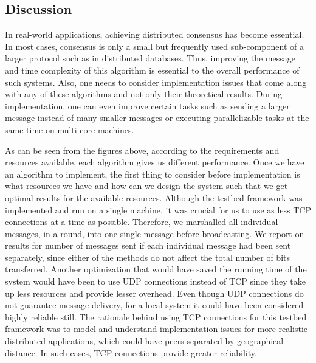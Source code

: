 %


\subsection{Discussion}

In real-world applications, achieving distributed consensus has become essential. In most cases, consensus is only a small but frequently used sub-component of a larger protocol such as in distributed databases. Thus, improving the message and time complexity of this algorithm is essential to the overall performance of such systems. Also, one needs to consider implementation issues that come along with any of these algorithms and not only their theoretical results. During implementation, one can even improve certain tasks such as sending a larger message instead of many smaller messages or executing parallelizable tasks at the same time on multi-core machines.  

As can be seen from the figures above, according to the requirements and resources available, each algorithm gives us different performance. Once we have an algorithm to implement, the first thing to consider before implementation is what resources we have and how can we design the system such that we get optimal results for the available resources. Although the testbed framework was implemented and run on a single machine, it was crucial for us to use as less TCP connections at a time as possible. Therefore, we marshalled all individual messages, in a round, into one single message before broadcasting. We report on results for number of messages sent if each individual message had been sent separately, since either of the methods do not affect the total number of bits transferred. Another optimization that would have saved the running time of the system would have been to use UDP connections instead of TCP since they take up less resources and provide lesser overhead. Even though UDP connections do not guarantee message delivery, for a local system it could have been considered highly reliable still. The rationale behind using TCP connections for this testbed framework was to model and understand implementation issues for more realistic distributed applications, which could have peers separated by geographical distance. In such cases, TCP connections provide greater reliability. 

